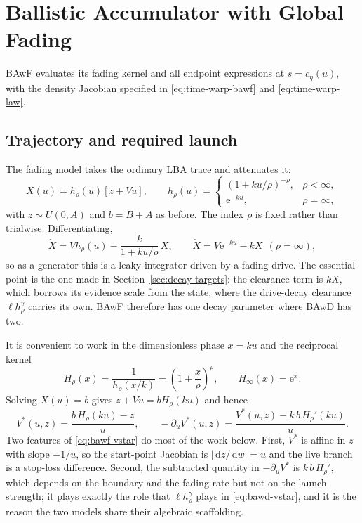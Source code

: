 \documentclass[12pt]{article}
\newcommand{\dd}{\,\mathrm{d}}
\newcommand{\e}{\mathrm{e}}
\theoremstyle{remark}
\begin{document}
\section{Ballistic Accumulator with Global Fading}
\label{sec:bawf}
BAwF evaluates its fading kernel and all endpoint expressions at \(s=c_\eta(u)\), with the density Jacobian specified in
\eqref{eq:time-warp-bawf} and \eqref{eq:time-warp-law}.
\subsection{Trajectory and required launch}
The fading model takes the ordinary LBA trace and attenuates it:
\begin{equation}
  X(u) = h_\rho(u)\left[z + Vu\right],
  \qquad
  h_\rho(u) =
  \begin{cases}
    (1+ku/\rho)^{-\rho}, & \rho<\infty,\\
    \e^{-ku}, & \rho=\infty,
  \end{cases}
  \label{eq:bawf-traj}
\end{equation}
with $z\sim U(0,A)$ and $b=B+A$ as before. The index $\rho$ is fixed rather than trialwise. Differentiating,
\begin{equation}
  \dot X = V h_\rho(u) - \frac{k}{1+ku/\rho}\,X,
  \qquad
  \dot X = V\e^{-ku} - kX \ \ (\rho=\infty),
  \label{eq:bawf-generator}
\end{equation}
so as a generator this is a leaky integrator driven by a fading drive. The essential point is the one made in Section~\ref{sec:decay-targets}: the clearance term is $kX$, which borrows its evidence scale from the state, where the drive-decay clearance $\ell h_\rho^\gamma$ carries its own. BAwF therefore has one decay parameter where BAwD has two.

It is convenient to work in the dimensionless phase $x=ku$ and the reciprocal kernel
\begin{equation}
  H_\rho(x) = \frac{1}{h_\rho(x/k)} = \left(1+\frac{x}{\rho}\right)^{\rho},
  \qquad H_\infty(x)=\e^{x}.
  \label{eq:bawf-H}
\end{equation}
Solving $X(u)=b$ gives $z+Vu = bH_\rho(ku)$ and hence
\begin{equation}
  V^{*}(u,z) = \frac{b\,H_\rho(ku)-z}{u},
  \qquad
  -\partial_u V^{*}(u,z)
  = \frac{V^{*}(u,z) - k\,b\,H_\rho'(ku)}{u}.
  \label{eq:bawf-vstar}
\end{equation}
Two features of \eqref{eq:bawf-vstar} do most of the work below. First, $V^{*}$ is affine in $z$ with slope $-1/u$, so the start-point Jacobian is $|\dd z/\dd w| = u$ and the live branch is a stop-loss difference. Second, the subtracted quantity in $-\partial_uV^{*}$ is $k\,b\,H_\rho'$, which depends on the boundary and the fading rate but not on the launch strength; it plays exactly the role that $\ell h_\rho^\gamma$ plays in \eqref{eq:bawd-vstar}, and it is the reason the two models share their algebraic scaffolding.
\end{document}
